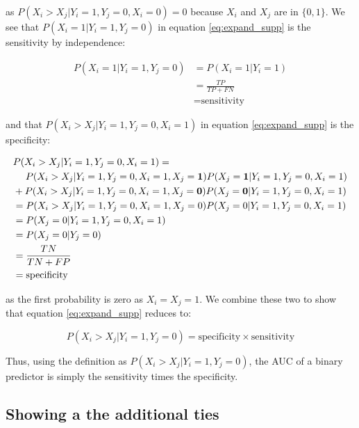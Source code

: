 \documentclass[article]{jss}
\begin{document}
as \(P(X_{i} > X_{j} | Y_{i} = 1, Y_{j} = 0, X_{i} = 0) = 0\) because
\(X_{i}\) and \(X_{j}\) are in \(\{0, 1\}\). We see that
\(P(X_{i} = 1 | Y_{i} = 1, Y_{j} = 0)\) in equation
\eqref{eq:expand_supp} is the sensitivity by independence:

\begin{align*}
P(X_{i} = 1 | Y_{i} = 1, Y_{j} = 0) &= P(X_{i} = 1 | Y_{i} = 1) \\
&= \frac{TP}{TP + FN} \\
&= \text{sensitivity}
\end{align*}

and that \(P(X_{i} > X_{j} | Y_{i} = 1, Y_{j} = 0, X_{i} = 1)\) in
equation \eqref{eq:expand_supp} is the specificity:

\begin{align*}
& P(X_{i} > X_{j} | Y_{i} = 1, Y_{j} = 0, X_{i} = 1) =  \\
& \hspace{1.3em}P(X_{i} > X_{j} | Y_{i} = 1, Y_{j} = 0, X_{i} = 1, X_{j} = {\bf 1}) P(X_{j} = {\bf 1} | Y_{i} = 1, Y_{j} = 0, X_{i} = 1) \\
&+ P(X_{i} > X_{j} | Y_{i} = 1, Y_{j} = 0, X_{i} = 1, X_{j} = {\bf 0}) P(X_{j} = {\bf 0} | Y_{i} = 1, Y_{j} = 0, X_{i} = 1) \\
&= P(X_{i} > X_{j} | Y_{i} = 1, Y_{j} = 0, X_{i} = 1, X_{j} = 0) P(X_{j} = 0 | Y_{i} = 1, Y_{j} = 0, X_{i} = 1) \\
&= P(X_{j} = 0 | Y_{i} = 1, Y_{j} = 0, X_{i} = 1) \\
&= P(X_{j} = 0 | Y_{j} = 0)\\
&= \frac{TN}{TN + FP} \\
&= \text{specificity}
\end{align*}

as the first probability is zero as \(X_{i} = X_{j} = 1\). We combine
these two to show that equation \eqref{eq:expand_supp} reduces to:

\[
P(X_{i} > X_{j} | Y_{i} = 1, Y_{j} = 0) = \text{specificity} \times \text{sensitivity}
\]

Thus, using the definition as
\(P(X_{i} > X_{j} | Y_{i} = 1, Y_{j} = 0)\), the AUC of a binary
predictor is simply the sensitivity times the specificity.

\hypertarget{showing-a-the-additional-ties}{%
\subsection{Showing a the additional
ties}\label{showing-a-the-additional-ties}}
\end{document}
